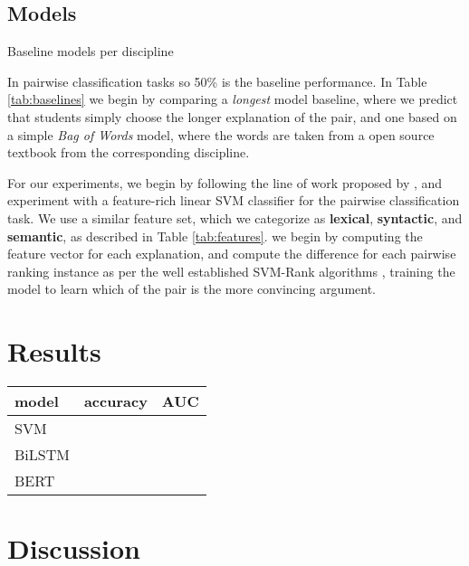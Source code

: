 \documentclass[runningheads]{llncs}
\begin{document}
\subsection{Models}

\begin{table}
	
	\caption{Baseline models per discipline}
	\label{tab:baselines}
\end{table}


In pairwise classification tasks so 50\% is the baseline performance.  In Table 
\ref{tab:baselines} we begin by comparing a \textit{longest} model baseline, 
where we predict that students simply choose the longer explanation of the 
pair, and one based on a simple \textit{Bag of Words} model, where the words 
are taken from a open source textbook from the corresponding discipline. 

For our experiments, we begin by following the line of work proposed by 
\cite{habernal_which_2016}, and experiment with a feature-rich linear SVM 
classifier for the pairwise classification task. We use a similar feature set, 
which we categorize as \textbf{lexical}, \textbf{syntactic}, and 
\textbf{semantic}, as described in Table \ref{tab:features}. we begin by 
computing the feature vector for each explanation, and compute the difference 
for each pairwise ranking instance as per the well established SVM-Rank 
algorithms \cite{joachims_optimizing_2002}, training the model to learn which 
of the pair is the more convincing argument. 


\section{Results}
\begin{table}
	\begin{tabular}{l|l|l}
		\toprule
		model & accuracy & AUC \\
		\toprule
		SVM &  &  \\
		BiLSTM & & \\
		BERT & & \\	
	\end{tabular}
\end{table}
\section{Discussion}
\end{document}
